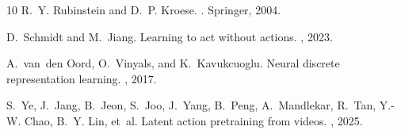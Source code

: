 \documentclass[11pt,letterpaper]{article}
\begin{document}
\begin{thebibliography}{10}
R.~Y. Rubinstein and D.~P. Kroese.
.
\newblock Springer, 2004.

D.~Schmidt and M.~Jiang.
\newblock Learning to act without actions.
, 2023.

A.~van~den Oord, O.~Vinyals, and K.~Kavukcuoglu.
\newblock Neural discrete representation learning.
, 2017.

S.~Ye, J.~Jang, B.~Jeon, S.~Joo, J.~Yang, B.~Peng, A.~Mandlekar, R.~Tan, Y.-W. Chao, B.~Y. Lin, et~al.
\newblock Latent action pretraining from videos.
, 2025.

\end{thebibliography}
\end{document}
